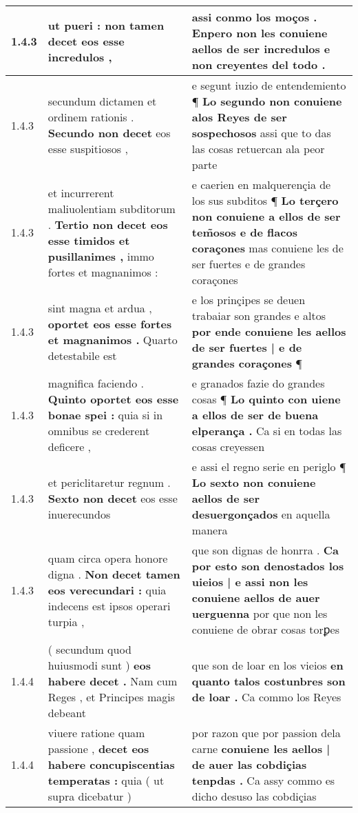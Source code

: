 \begin{tabular}{|p{1cm}|p{6.5cm}|p{6.5cm}|}
1.4.3 & ut pueri : \textbf{ non tamen decet } eos esse incredulos , & assi conmo los moços . \textbf{ Enpero non les conuiene aellos de ser incredulos } e non creyentes del todo . \\\hline
1.4.3 & secundum dictamen et ordinem rationis . \textbf{ Secundo non decet } eos esse suspitiosos , & e segunt iuzio de entendemiento ¶ \textbf{ Lo segundo non conuiene alos Reyes de ser sospechosos } assi que to das las cosas retuercan ala peor parte \\\hline
1.4.3 & et incurrerent maliuolentiam subditorum . \textbf{ Tertio non decet eos esse timidos et pusillanimes , } immo fortes et magnanimos : & e caerien en malquerençia de los sus subditos ¶ \textbf{ Lo terçero non conuiene a ellos de ser tem̃osos e de flacos coraçones } mas conuiene les de ser fuertes e de grandes coraçones \\\hline
1.4.3 & sint magna et ardua , \textbf{ oportet eos esse fortes et magnanimos . } Quarto detestabile est & e los prinçipes se deuen trabaiar son grandes e altos \textbf{ por ende conuiene les aellos de ser fuertes | e de grandes coraçones } ¶ \\\hline
1.4.3 & magnifica faciendo . \textbf{ Quinto oportet eos esse bonae spei : } quia si in omnibus se crederent deficere , & e granados fazie do grandes cosas ¶ \textbf{ Lo quinto con uiene a ellos de ser de buena elperança . } Ca si en todas las cosas creyessen \\\hline
1.4.3 & et periclitaretur regnum . \textbf{ Sexto non decet } eos esse inuerecundos & e assi el regno serie en periglo ¶ \textbf{ Lo sexto non conuiene aellos de ser desuergonçados } en aquella manera \\\hline
1.4.3 & quam circa opera honore digna . \textbf{ Non decet tamen eos verecundari : } quia indecens est ipsos operari turpia , & que son dignas de honrra . \textbf{ Ca por esto son denostados los uieios | e assi non les conuiene aellos de auer uerguenna } por que non les conuiene de obrar cosas torꝑes \\\hline
1.4.4 & ( secundum quod huiusmodi sunt ) \textbf{ eos habere decet . } Nam cum Reges , et Principes magis debeant & que son de loar en los vieios \textbf{ en quanto talos costunbres son de loar . } Ca commo los Reyes \\\hline
1.4.4 & viuere ratione quam passione , \textbf{ decet eos habere concupiscentias temperatas : } quia ( ut supra dicebatur ) & por razon que por passion dela carne \textbf{ conuiene les aellos | de auer las cobdiçias tenpdas . } Ca assy commo es dicho desuso las cobdiçias \\\hline

\end{tabular}
